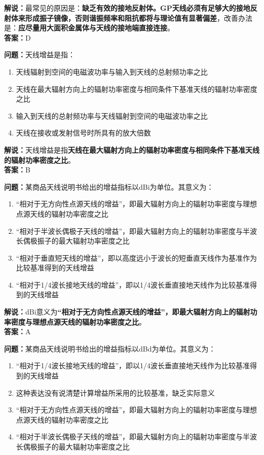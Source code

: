 \documentclass{ctexbook}
\begin{document}
\noindent\textbf{解说：}最常见的原因是：\textbf{缺乏有效的接地反射体。GP天线必须有足够大的接地反射体来形成振子镜像，否则谐振频率和阻抗都将与理论值有显著偏差}，改善办法是：\textbf{应尽量用大面积金属体与天线的接地端直接连接}。\\\noindent\textbf{答案：}D


\bigskip


\noindent\textbf{问题：}天线增益是指：

\begin{enumerate}[label=\Alph*), leftmargin=3em]
	\item 天线辐射到空间的电磁波功率与输入到天线的总射频功率之比
	\item 天线在最大辐射方向上的辐射功率密度与相同条件下基准天线的辐射功率密度之比
	\item 输入到天线的总射频功率与天线辐射到空间的电磁波功率之比
	\item 天线在接收或发射信号时所具有的放大倍数
\end{enumerate}

\noindent\textbf{解说：}天线增益是指\textbf{天线在最大辐射方向上的辐射功率密度与相同条件下基准天线的辐射功率密度之比}。\\\noindent\textbf{答案：}B


\bigskip


\noindent\textbf{问题：}某商品天线说明书给出的增益指标以dBi为单位。其意义为：
\begin{enumerate}[label=\Alph*), leftmargin=3em]
	\item “相对于无方向性点源天线的增益”，即最大辐射方向上的辐射功率密度与理想点源天线的辐射功率密度之比
	\item “相对于半波长偶极子天线的增益”，即最大辐射方向上的辐射功率密度与半波长偶极振子的最大辐射功率密度之比
	\item “相对于垂直短天线的增益”，即以高度远小于波长的短垂直天线作为基准作为比较基准得到的天线增益
	\item “相对于1/4波长接地天线的增益”，即以1/4波长垂直接地天线作为比较基准得到的天线增益
\end{enumerate}

\noindent\textbf{解说：}dBi意义为\textbf{“相对于无方向性点源天线的增益”，即最大辐射方向上的辐射功率密度与理想点源天线的辐射功率密度之比}。\\\noindent\textbf{答案：}A


\bigskip


\noindent\textbf{问题：}某商品天线说明书给出的增益指标以dBd为单位。其意义为：

\begin{enumerate}[label=\Alph*), leftmargin=3em]
	\item “相对于1/4波长接地天线的增益”，即以1/4波长垂直接地天线作为比较基准得到的天线增益
	\item 这种表达没有说清楚计算增益所采用的比较基准，缺乏实际意义
	\item “相对于无方向性点源天线的增益”，即最大辐射方向上的辐射功率密度与理想点源天线的辐射功率密度之比
	\item “相对于半波长偶极子天线的增益”，即最大辐射方向上的辐射功率密度与半波长偶极振子的最大辐射功率密度之比
\end{enumerate}
\end{document}
